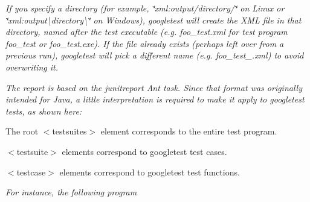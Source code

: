 {\itshape If you specify a directory (for example, {\ttfamily \char`\"{}xml\+:output/directory/\char`\"{}} on Linux or {\ttfamily \char`\"{}xml\+:output\textbackslash{}directory\textbackslash{}\char`\"{}} on Windows), googletest will create the X\+ML file in that directory, named after the test executable (e.\+g. {\ttfamily foo\+\_\+test.\+xml} for test program {\ttfamily foo\+\_\+test} or {\ttfamily foo\+\_\+test.\+exe}). If the file already exists (perhaps left over from a previous run), googletest will pick a different name (e.\+g. {\ttfamily foo\+\_\+test\+\_.\+xml}) to avoid overwriting it.}

{\itshape The report is based on the {\ttfamily junitreport} Ant task. Since that format was originally intended for Java, a little interpretation is required to make it apply to googletest tests, as shown here\+:}

{\itshape 
\begin{DoxyCode}{0}
\DoxyCodeLine{      <\textcolor{keywordtype}{failure} \textcolor{keyword}{message}=\textcolor{stringliteral}{"..."}/>}
\DoxyCodeLine{      <\textcolor{keywordtype}{failure} \textcolor{keyword}{message}=\textcolor{stringliteral}{"..."}/>}
\DoxyCodeLine{      <\textcolor{keywordtype}{failure} \textcolor{keyword}{message}=\textcolor{stringliteral}{"..."}/>}
\DoxyCodeLine{    </\textcolor{keywordtype}{testcase}>}
\DoxyCodeLine{  </\textcolor{keywordtype}{testsuite}>}
\DoxyCodeLine{</\textcolor{keywordtype}{testsuites}>}
\end{DoxyCode}
}

{\itshape 
\begin{DoxyItemize}
\item The root {\ttfamily $<$testsuites$>$} element corresponds to the entire test program.
\item {\ttfamily $<$testsuite$>$} elements correspond to googletest test cases.
\item {\ttfamily $<$testcase$>$} elements correspond to googletest test functions.
\end{DoxyItemize}}

{\itshape For instance, the following program}

